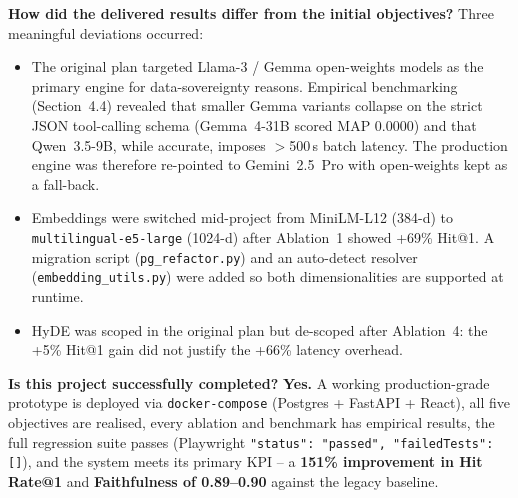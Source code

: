 \documentclass[11pt, a4paper]{article}
\begin{document}
\textbf{How did the delivered results differ from the initial objectives?} Three meaningful deviations occurred:
\begin{itemize}[leftmargin=*]
    \item The original plan targeted Llama-3 / Gemma open-weights models as the primary engine for data-sovereignty reasons. Empirical benchmarking (Section~4.4) revealed that smaller Gemma variants collapse on the strict JSON tool-calling schema (Gemma~4-31B scored MAP 0.0000) and that Qwen~3.5-9B, while accurate, imposes $>$500\,s batch latency. The production engine was therefore re-pointed to Gemini~2.5~Pro with open-weights kept as a fall-back.
    \item Embeddings were switched mid-project from MiniLM-L12 (384-d) to \texttt{multilingual-e5-large} (1024-d) after Ablation~1 showed +69\% Hit@1. A migration script (\texttt{pg\_refactor.py}) and an auto-detect resolver (\texttt{embedding\_utils.py}) were added so both dimensionalities are supported at runtime.
    \item HyDE was scoped in the original plan but de-scoped after Ablation~4: the +5\% Hit@1 gain did not justify the +66\% latency overhead.
\end{itemize}

\textbf{Is this project successfully completed?} \textbf{Yes.} A working production-grade prototype is deployed via \texttt{docker-compose} (Postgres + FastAPI + React), all five objectives are realised, every ablation and benchmark has empirical results, the full regression suite passes (Playwright \texttt{"status": "passed", "failedTests": []}), and the system meets its primary KPI -- a \textbf{151\% improvement in Hit Rate@1} and \textbf{Faithfulness of 0.89--0.90} against the legacy baseline.
\end{document}
